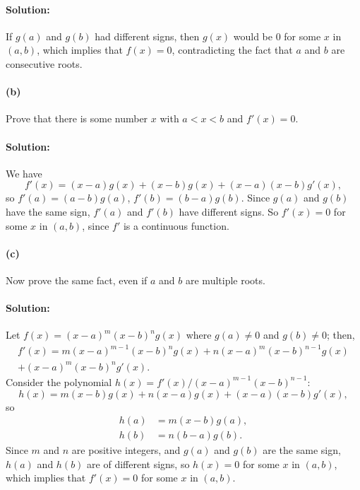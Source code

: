 \documentclass{article}
\begin{document}
\paragraph{Solution:} If $g(a)$ and $g(b)$ had different signs, then $g(x)$
would be 0 for some $x$ in $(a, b)$, which implies that $f(x) = 0$,
contradicting the fact that $a$ and $b$ are consecutive roots.

\paragraph{(b)} Prove that there is some number $x$ with $a < x < b$ and $f'(x)
= 0$.

\paragraph{Solution:} We have \begin{equation*}
  f'(x) = (x - a)g(x) + (x - b)g(x) + (x - a)(x - b)g'(x),
\end{equation*} so $f'(a) = (a - b)g(a)$, $f'(b) = (b - a)g(b)$. Since $g(a)$
and $g(b)$ have the same sign, $f'(a)$ and $f'(b)$ have different signs. So
$f'(x) = 0$ for some $x$ in $(a, b)$, since $f'$ is a continuous function.

\paragraph{(c)} Now prove the same fact, even if $a$ and $b$ are multiple
roots.

\paragraph{Solution:} Let $f(x) = (x - a)^m(x - b)^ng(x)$ where $g(a) \neq 0$
and $g(b) \neq 0$; then, \begin{multline*}
  f'(x) = m(x - a)^{m - 1}(x - b)^ng(x) + n(x - a)^m(x - b)^{n - 1}g(x) \\
    + (x - a)^m(x - b)^ng'(x).
\end{multline*}
Consider the polynomial $h(x) = f'(x)/(x - a)^{m - 1}(x - b)^{n - 1}$:
\begin{equation*}
  h(x) = m(x - b)g(x) + n(x - a)g(x) + (x - a)(x - b)g'(x),
\end{equation*} so \begin{align*}
  h(a) &= m(x - b)g(a), \\
  h(b) &= n(b - a)g(b).
\end{align*}
Since $m$ and $n$ are positive integers, and $g(a)$ and $g(b)$ are the same
sign, $h(a)$ and $h(b)$ are of different signs, so $h(x) = 0$ for some $x$ in
$(a, b)$, which implies that $f'(x) = 0$ for some $x$ in $(a, b)$.
\end{document}
